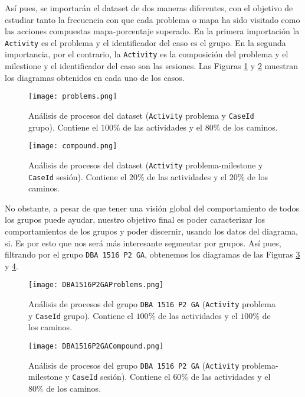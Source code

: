 Así pues, se importarán el dataset de dos maneras diferentes, con el objetivo de estudiar tanto la frecuencia con que cada problema o mapa ha sido visitado como las acciones compuestas mapa-porcentaje superado. En la primera importación la \texttt{Activity} es el problema y el identificador del caso es el grupo. En la segunda importancia, por el contrario, la \texttt{Activity} es la composición del problema y el milestione y el identificador del caso son las sesiones. Las Figuras \ref{fig:problems} y \ref{fig:compound} muestran los diagramas obtenidos en cada uno de los casos.

\begin{figure}[H]
    \centering
    \texttt{[image: problems.png]}
    \caption{Análisis de procesos del dataset (\texttt{Activity} problema y \texttt{CaseId} grupo). Contiene el $100\%$ de las actividades y el $80\%$ de los caminos.}
    \label{fig:problems}
\end{figure}

\begin{figure}[H]
    \centering
    \texttt{[image: compound.png]}
    \caption{Análisis de procesos del dataset (\texttt{Activity} problema-milestone y \texttt{CaseId} sesión). Contiene el $20\%$ de las actividades y el $20\%$ de los caminos.}
    \label{fig:compound}
\end{figure}

No obstante, a pesar de que tener una visión global del comportamiento de todos los grupos puede ayudar, nuestro objetivo final es poder caracterizar los comportamientos de los grupos y poder discernir, usando los datos del diagrama, si. Es por esto que nos será más interesante segmentar por grupos. Así pues, filtrando por el grupo \texttt{DBA 1516 P2 GA}, obtenemos los diagramas de las Figuras \ref{fig:problemsDBA1516P2GA} y \ref{fig:compoundDBA1516P2GA}.

\begin{figure}[H]
    \centering
    \texttt{[image: DBA1516P2GAProblems.png]}
    \caption{Análisis de procesos del grupo \texttt{DBA 1516 P2 GA} (\texttt{Activity} problema y \texttt{CaseId} grupo). Contiene el $100\%$ de las actividades y el $100\%$ de los caminos.}
    \label{fig:problemsDBA1516P2GA}
\end{figure}

\begin{figure}[H]
    \centering
    \texttt{[image: DBA1516P2GACompound.png]}
    \caption{Análisis de procesos del grupo \texttt{DBA 1516 P2 GA} (\texttt{Activity} problema-milestone y \texttt{CaseId} sesión). Contiene el $60\%$ de las actividades y el $80\%$ de los caminos.}
    \label{fig:compoundDBA1516P2GA}
\end{figure}

